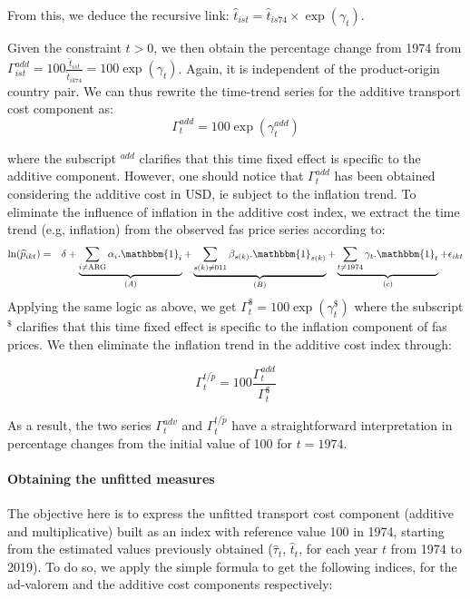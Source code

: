 \documentclass[a4paper,11pt]{article}
\begin{document}
From this, we deduce the recursive link: $\widehat{t}_{ist} = \widehat{t}_{is74} \times \exp(\gamma_t)$.

Given the constraint $t>0$, we then obtain the percentage change from 1974 from $\Gamma^{add}_{ist} = 100\frac{\widehat{t}_{ist}}{\widehat{t}_{ik74}} = 100\exp(\gamma_t)$. Again, it is independent of the product-origin country pair. We can thus rewrite the time-trend series for the additive transport cost component as:
\begin{equation}
\Gamma^{add}_t  = 100\exp(\gamma^{add}_t) \label{eq:tcadd_compoeffect}
\end{equation}




\noindent where the subscript $^{add}$ clarifies that this time fixed effect is specific to the additive component. However, one should notice that $\Gamma^{add}_t$ has been obtained considering the additive cost in USD, ie subject to the inflation trend. To eliminate the influence of inflation in the additive cost index, we extract the time trend (e.g, inflation) from the observed fas price series according to:
\begin{eqnarray}
\ln(\widehat{p}_{ikt})&=&\delta +\underbrace{\sum_{i \neq \text{ARG}}\alpha_i.\mathbbm{1}_i}_{(A)} + \underbrace{\sum_{s(k)\neq \text{011}}\beta_{s(k)}.\mathbbm{1}_{s(k)}}_{(B)} + \underbrace{\sum_{t \neq 1974}\gamma_t.\mathbbm{1}_t}_{(c)}+\epsilon_{ikt} \label{eq:compeffects_pfas}
\end{eqnarray}
Applying the same logic as above, we get $\Gamma^{\$}_t = 100\exp(\gamma^{\$}_t)$ where the subscript $^{\$}$ clarifies that this time fixed effect is specific to the inflation component of fas prices. We then eliminate the inflation trend in the additive cost index through:

\begin{equation}
\Gamma^{t/\widetilde{p}}_t  = 100 \frac{\Gamma^{add}_t}{\Gamma^{\$}_t} \label{eq:tsptilde_compoeffect}
\end{equation}

As a result, the two series $\Gamma^{adv}_t$ and $\Gamma^{t/\widetilde{p}}_t$ have a straightforward interpretation in percentage changes from the initial value of 100 for $t=1974$.



\paragraph{Obtaining the unfitted measures} The objective here is to express the unfitted transport cost component (additive and multiplicative) built as an index with reference value 100 in 1974, starting from the estimated values previously obtained ($\widehat{\tau}_t$, $\widehat{t}_t$, for each year $t$ from 1974 to 2019).
To do so, we apply the simple formula to get the following indices, for the ad-valorem and the additive cost components respectively:
\end{document}
